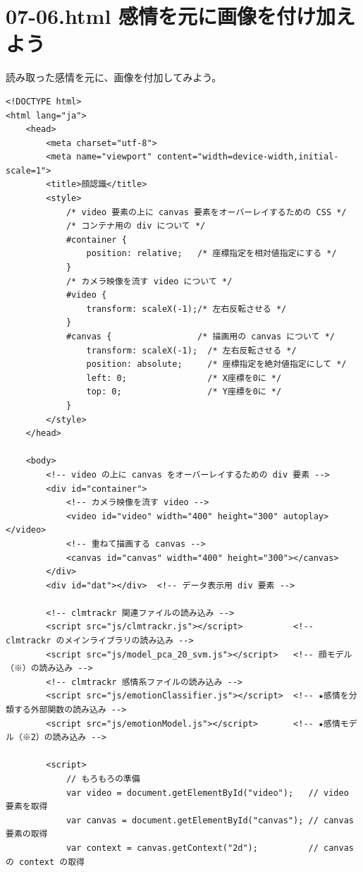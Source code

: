 \documentclass[mingoth,11pt,a4j,uplatex]{jsarticle}
\begin{document}
\newpage
\section{07-06.html 感情を元に画像を付け加えよう}
読み取った感情を元に、画像を付加してみよう。

\begin{lstlisting}[caption=.07-06html]
<!DOCTYPE html>
<html lang="ja">
    <head>
        <meta charset="utf-8">
        <meta name="viewport" content="width=device-width,initial-scale=1">
        <title>顔認識</title>
        <style>
            /* video 要素の上に canvas 要素をオーバーレイするための CSS */
            /* コンテナ用の div について */
            #container {              
                position: relative;   /* 座標指定を相対値指定にする */
            }
            /* カメラ映像を流す video について */
            #video {                  
                transform: scaleX(-1);/* 左右反転させる */
            }
            #canvas {                 /* 描画用の canvas について */
                transform: scaleX(-1);  /* 左右反転させる */
                position: absolute;     /* 座標指定を絶対値指定にして */
                left: 0;                /* X座標を0に */
                top: 0;                 /* Y座標を0に */
            }
        </style>
    </head>

    <body>
        <!-- video の上に canvas をオーバーレイするための div 要素 -->
        <div id="container">  
            <!-- カメラ映像を流す video -->
            <video id="video" width="400" height="300" autoplay></video>
            <!-- 重ねて描画する canvas -->
            <canvas id="canvas" width="400" height="300"></canvas>        
        </div>
        <div id="dat"></div>  <!-- データ表示用 div 要素 -->
        
        <!-- clmtrackr 関連ファイルの読み込み -->
        <script src="js/clmtrackr.js"></script>          <!-- clmtrackr のメインライブラリの読み込み -->
        <script src="js/model_pca_20_svm.js"></script>   <!-- 顔モデル（※）の読み込み -->
        <!-- clmtrackr 感情系ファイルの読み込み -->
        <script src="js/emotionClassifier.js"></script>  <!-- ★感情を分類する外部関数の読み込み -->
        <script src="js/emotionModel.js"></script>       <!-- ★感情モデル（※2）の読み込み -->
        
        <script>
            // もろもろの準備
            var video = document.getElementById("video");   // video 要素を取得
            var canvas = document.getElementById("canvas"); // canvas 要素の取得
            var context = canvas.getContext("2d");          // canvas の context の取得
            

\end{lstlisting}
\end{document}
